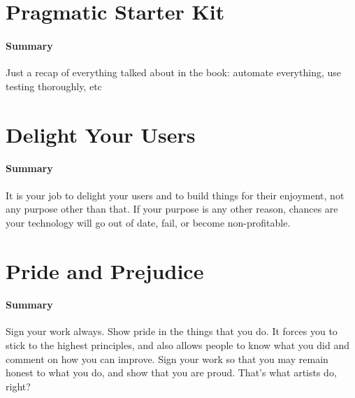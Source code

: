 \documentclass{article}
\begin{document}
\section{Pragmatic Starter Kit}
    \paragraph{Summary} Just a recap of everything talked about in the book: automate everything, use testing thoroughly, etc

\section{Delight Your Users}
    \paragraph{Summary} It is your job to delight your users and to build things for their enjoyment, not any purpose other than that. If your purpose is any other reason, chances are your technology will go out of date, fail, or become non-profitable. 

\section{Pride and Prejudice}
    \paragraph{Summary} Sign your work always. Show pride in the things that you do. It forces you to stick to the highest principles, and also allows people to know what you did and comment on how you can improve. Sign your work so that you may remain honest to what you do, and show that you are proud. That's what artists do, right?
\end{document}
